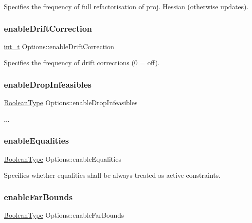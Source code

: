 Specifies the frequency of full refactorisation of proj. Hessian (otherwise updates). \mbox{\label{class_options_a702013b2914bd8122a5dc803d1444a59}} 
\subsubsection{\texorpdfstring{enable\+Drift\+Correction}{enableDriftCorrection}}
{\footnotesize\ttfamily \hyperlink{_types_8hpp_ab6fd6105e64ed14a0c9281326f05e623}{int\+\_\+t} Options\+::enable\+Drift\+Correction}

Specifies the frequency of drift corrections (0 = off). \mbox{\label{class_options_a471b77ce66c8b16a06e61d94af785f91}} 
\subsubsection{\texorpdfstring{enable\+Drop\+Infeasibles}{enableDropInfeasibles}}
{\footnotesize\ttfamily \hyperlink{_types_8hpp_a20f82124c82b6f5686a7fce454ef9089}{Boolean\+Type} Options\+::enable\+Drop\+Infeasibles}

... \mbox{\label{class_options_a21c673d77ae5210038a05ca2a41bd1da}} 
\subsubsection{\texorpdfstring{enable\+Equalities}{enableEqualities}}
{\footnotesize\ttfamily \hyperlink{_types_8hpp_a20f82124c82b6f5686a7fce454ef9089}{Boolean\+Type} Options\+::enable\+Equalities}

Specifies whether equalities shall be always treated as active constraints. \mbox{\label{class_options_aa691471f2994643343ddcf2b697a19aa}} 
\subsubsection{\texorpdfstring{enable\+Far\+Bounds}{enableFarBounds}}
{\footnotesize\ttfamily \hyperlink{_types_8hpp_a20f82124c82b6f5686a7fce454ef9089}{Boolean\+Type} Options\+::enable\+Far\+Bounds}

